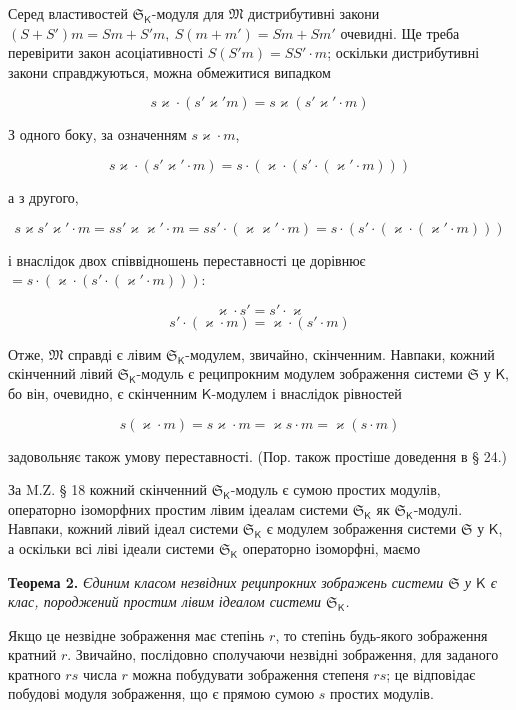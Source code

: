 \documentclass[11pt]{article}
\begin{document}
Серед властивостей \(\mathfrak S_{\mathsf K}\)-модуля для \(\mathfrak M\) дистрибутивні закони \((S+S')m=Sm+S'm,\ S(m+m')=Sm+Sm'\) очевидні. Ще треба перевірити закон асоціативності \(S(S'm)=SS'\cdot m\); оскільки дистрибутивні закони справджуються, можна обмежитися випадком

\[
s\varkappa \cdot(s'\varkappa ' m)=s\varkappa (s'\varkappa '\cdot m)
\]

З одного боку, за означенням \(s\varkappa \cdot m\),

\[
s\varkappa \cdot(s'\varkappa '\cdot m)=s\cdot(\varkappa \cdot(s'\cdot(\varkappa '\cdot m)))
\]

а з другого,

\[
s\varkappa  s'\varkappa '\cdot m=ss'\varkappa \varkappa '\cdot m=ss'\cdot(\varkappa \varkappa '\cdot m)
=s\cdot(s'\cdot(\varkappa \cdot(\varkappa '\cdot m)))
\]

і внаслідок двох співвідношень переставності це дорівнює \(=s\cdot(\varkappa \cdot(s'\cdot(\varkappa '\cdot m)))\):

\[
\varkappa \cdot s'=s'\cdot \varkappa
\]
\[
s'\cdot(\varkappa \cdot m)=\varkappa \cdot(s'\cdot m)
\]

Отже, \(\mathfrak M\) справді є лівим \(\mathfrak S_{\mathsf K}\)-модулем, звичайно, скінченним. Навпаки, кожний скінченний лівий \(\mathfrak S_{\mathsf K}\)-модуль є реципрокним модулем зображення системи \(\mathfrak S\) у \(\mathsf K\), бо він, очевидно, є скінченним \(\mathsf K\)-модулем і внаслідок рівностей

\[
s(\varkappa \cdot m)=s\varkappa \cdot m=\varkappa s\cdot m=\varkappa (s\cdot m)
\]

задовольняє також умову переставності. (Пор. також простіше доведення в § 24.)

За M.Z. § 18 кожний скінченний \(\mathfrak S_{\mathsf K}\)-модуль є сумою простих модулів, операторно ізоморфних простим лівим ідеалам системи \(\mathfrak S_{\mathsf K}\) як \(\mathfrak S_{\mathsf K}\)-модулі. Навпаки, кожний лівий ідеал системи \(\mathfrak S_{\mathsf K}\) є модулем зображення системи \(\mathfrak S\) у \(\mathsf K\), а оскільки всі ліві ідеали системи \(\mathfrak S_{\mathsf K}\) операторно ізоморфні, маємо

\textbf{Теорема 2.} \emph{Єдиним класом незвідних реципрокних зображень системи \(\mathfrak S\) у \(\mathsf K\) є клас, породжений простим лівим ідеалом системи \(\mathfrak S_{\mathsf K}\).}

Якщо це незвідне зображення має степінь \(r\), то степінь будь-якого зображення кратний \(r\). Звичайно, послідовно сполучаючи незвідні зображення, для заданого кратного \(rs\) числа \(r\) можна побудувати зображення степеня \(rs\); це відповідає побудові модуля зображення, що є прямою сумою \(s\) простих модулів.
\end{document}
